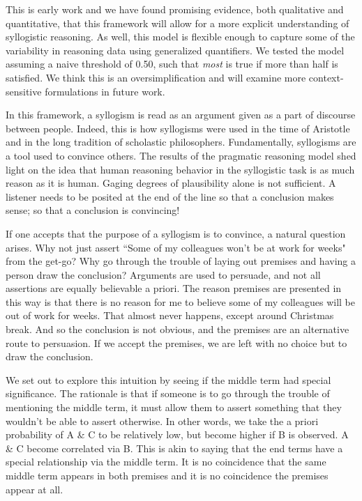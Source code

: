 \documentclass[10pt,letterpaper]{article}
\begin{document}
This is early work and we have found promising evidence, both qualitative and quantitative, that this framework will allow for a more explicit understanding of syllogistic reasoning. As well, this model is flexible enough to capture some of the variability in reasoning data using generalized quantifiers. We tested the model assuming a naive threshold of 0.50, such that \emph{most} is true if more than half is satisfied. We think this is an oversimplification and will examine more context-sensitive formulations in future work.

In this framework, a syllogism is read as an argument given as a part of discourse between people. Indeed, this is how syllogisms were used in the time of Aristotle and in the long tradition of scholastic philosophers. Fundamentally, syllogisms are a tool used to convince others. The results of the pragmatic reasoning model shed light on the idea that human reasoning behavior in the syllogistic task is as much reason as it is human. Gaging degrees of plausibility alone is not sufficient. A listener needs to be posited at the end of the line so that a conclusion makes sense; so that a conclusion is convincing!

If one accepts that the purpose of a syllogism is to convince, a natural question arises. Why not just assert ``Some of my colleagues won't be at work for weeks" from the get-go? Why go through the trouble of laying out premises and having a person draw the conclusion? Arguments are used to persuade, and not all assertions are equally believable a priori. The reason premises are presented in this way is that there is no reason for me to believe some of my colleagues will be out of work for weeks. That almost never happens, except around Christmas break. And so the conclusion is not obvious, and the premises are an alternative route to persuasion. If we accept the premises, we are left with no choice but to draw the conclusion.

We set out to explore this intuition by seeing if the middle term had special significance. The rationale is that if someone is to go through the trouble of mentioning the middle term, it must allow them to assert something that they wouldn't be able to assert otherwise. In other words, we take the a priori probability of A \& C to be relatively low, but become higher if B is observed. A \& C become correlated via B. This is akin to saying that the end terms have a special relationship via the middle term. It is no coincidence that the same middle term appears in both premises and it is no coincidence the premises appear at all. 
\end{document}
